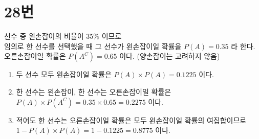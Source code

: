 \documentclass[12px]{article}
\begin{document}
\section*{28번}
선수 중 왼손잡이의 비율이 35\% 이므로\\
임의로 한 선수를 선택했을 때 그 선수가 왼손잡이일 확률을 \(P(A) = 0.35 \) 라 한다.\\
오른손잡이일 확률은 \(P(A^C) = 0.65 \) 이다. (양손잡이는 고려하지 않음)
\begin{enumerate}[(1)]
    \item
    두 선수 모두 왼손잡이일 확률은 \(P(A) \times P(A) =  0.1225 \) 이다.
    \item
    한 선수는 왼손잡이, 한 선수는 오른손잡이일 확률은\\
    \(P(A) \times P(A^C) = 0.35 \times 0.65 = 0.2275 \) 이다.
    \item
    적어도 한 선수는 오른손잡이일 확률은 모두 왼손잡이일 확률의 여집합이므로\\
    \(1 - P(A) \times P(A) = 1 - 0.1225 = 0.8775 \) 이다.
\end{enumerate}
\end{document}
